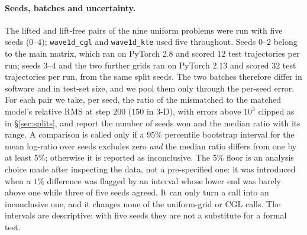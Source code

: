 \documentclass[11pt]{article}
\theoremstyle{definition}
\theoremstyle{remark}
\begin{document}
\paragraph{Seeds, batches and uncertainty.} The lifted and lift-free pairs of
the nine uniform problems were run with five seeds ($0$--$4$); \texttt{wave1d\_cgl}
and \texttt{wave1d\_kte} used five throughout. Seeds $0$--$2$ belong to the main
matrix, which ran on PyTorch 2.8 and scored $12$ test trajectories per run; seeds
$3$--$4$ and the two further grids ran on PyTorch 2.13 and scored $32$ test
trajectories per run, from the same split seeds. The two batches therefore differ
in software and in test-set size, and we pool them only through the per-seed
error. For each pair we take, per seed, the ratio of the mismatched to the matched
model's relative RMS at step $200$ ($150$ in $3$-D), with errors above $10^{3}$
clipped as in \S\ref{sec:splits}, and report the number of seeds won and the
median ratio with its range. A comparison is called only if a $95\%$ percentile
bootstrap interval \citep{efron1994bootstrap} for the mean log-ratio over seeds
excludes zero \emph{and} the median ratio differs from one by at least $5\%$;
otherwise it is reported as inconclusive. The $5\%$ floor is an analysis choice
made after inspecting the data, not a pre-specified one: it was introduced when a
$1\%$ difference was flagged by an interval whose lower end was barely above one
while three of five seeds agreed. It can only turn a call into an inconclusive
one, and it changes none of the uniform-grid or CGL calls. The intervals are
descriptive: with five seeds they are not a substitute for a formal test.
\end{document}
